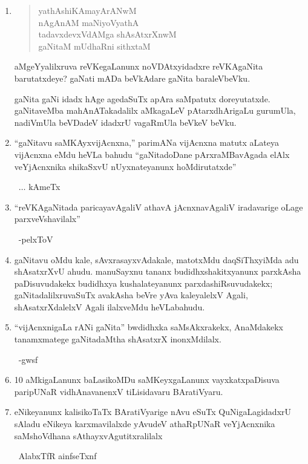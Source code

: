 \begin{enumerate}[\rm 1)]
\item
\begin{center} 
\begin{verse}
yathAshiKAmayArANwM\\
nAgAnAM maNiyoVyathA\\
tadavxdevxVdAMga shAsAtxrXnwM\\
gaNitaM mUdhaRni sithxtaM
\end{verse}
\end{center}
aMgeYyalilxruva reVKegaLanunx noVDAtxyidadxre reVKAgaNita barutatxdeye? gaNati mADa beVkAdare gaNita baraleVbeVku.

gaNita gaNi idadx hAge agedaSuTx apAra saMpatutx doreyutatxde. gaNitaveMba mahAnATakadalilx aMkagaLeV pAtarxdhArigaLu gurumUla, nadiVmUla beVDadeV idadxrU vagaRmUla beVkeV beVku.

\item ``gaNitavu saMKAyxvijAcnxna,'' parimANa vijAcnxna matutx aLateya vijAcnxna eMdu heVLa bahudu ``gaNitadoDane pArxraMBavAgada elAlx veYjAcnxnika shikaSxvU nUyxnateyanunx hoMdirutatxde'' 

~\hfill $\ldots$  kAmeTx

\item ``reVKAgaNitada paricayavAgaliV athavA jAcnxnavAgaliV iradavarige oLage parxveVshavilalx''

~\hfill -pelxToV

\item gaNitavu oMdu kale, sAvxrasayxvAdakale, matotxMdu daqSiThxyiMda adu shAsatxrXvU ahudu. manuSayxnu tananx budidhxshakitxyanunx parxkAsha paDisuvudakekx budidhxya kushalateyanunx parxdashiRsuvudakekx; gaNitadalilxruvaSuTx avakAsha beVre yAva kaleyalelxV Agali, shAsatxrXdalelxV Agali ilalxveMdu heVLabahudu.

\item ``vijAcnxnigaLa rANi gaNita'' bwdidhxka saMsAkxrakekx, AnaMdakekx tanamxmatege gaNitadaMtha shAsatxrX inonxMdilalx.

~\hfill -gwsf

\item {\rm 10} aMkigaLanunx baLasikoMDu saMKeyxgaLanunx vayxkatxpaDisuva paripUNaR vidhAna\-vanenxV tiLisidavaru BAratiVyaru.

\item eNikeyanunx kalisikoTaTx BAratiVyarige nAvu eSuTx QuNigaLagidadxrU sAladu eNikeya karxmavilalxde yAvudeV athaRpUNaR veYjAcnxnika saMshoVdhana sAthayx\-vAgutitxralilalx

~\hfill AlabxTfR ainfseTxnf


\end{enumerate}
